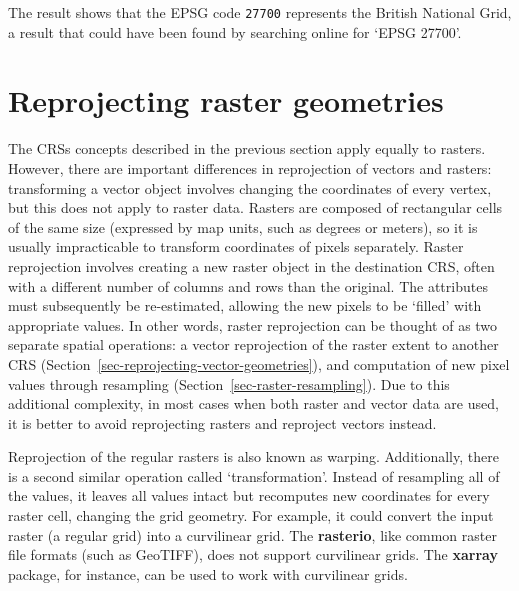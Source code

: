 \documentclass[
  letterpaper,
]{krantz}
\begin{document}
The result shows that the EPSG code \texttt{27700} represents the
British National Grid, a result that could have been found by searching
online for `EPSG 27700'.

\section{Reprojecting raster
geometries}\label{sec-reprojecting-raster-geometries}

The CRSs concepts described in the previous section apply equally to
rasters. However, there are important differences in reprojection of
vectors and rasters: transforming a vector object involves changing the
coordinates of every vertex, but this does not apply to raster data.
Rasters are composed of rectangular cells of the same size (expressed by
map units, such as degrees or meters), so it is usually impracticable to
transform coordinates of pixels separately. Raster reprojection involves
creating a new raster object in the destination CRS, often with a
different number of columns and rows than the original. The attributes
must subsequently be re-estimated, allowing the new pixels to be
`filled' with appropriate values. In other words, raster reprojection
can be thought of as two separate spatial operations: a vector
reprojection of the raster extent to another CRS
(Section~\ref{sec-reprojecting-vector-geometries}), and computation of
new pixel values through resampling
(Section~\ref{sec-raster-resampling}). Due to this additional
complexity, in most cases when both raster and vector data are used, it
is better to avoid reprojecting rasters and reproject vectors instead.

\begin{tcolorbox}[enhanced jigsaw, coltitle=black, colback=white, opacitybacktitle=0.6, rightrule=.15mm, titlerule=0mm, colbacktitle=quarto-callout-note-color!10!white, colframe=quarto-callout-note-color-frame, title=\textcolor{quarto-callout-note-color}{\faInfo}\hspace{0.5em}{Note}, left=2mm, breakable, arc=.35mm, bottomtitle=1mm, toptitle=1mm, bottomrule=.15mm, opacityback=0, leftrule=.75mm, toprule=.15mm]

Reprojection of the regular rasters is also known as warping.
Additionally, there is a second similar operation called
`transformation'. Instead of resampling all of the values, it leaves all
values intact but recomputes new coordinates for every raster cell,
changing the grid geometry. For example, it could convert the input
raster (a regular grid) into a curvilinear grid. The \textbf{rasterio},
like common raster file formats (such as GeoTIFF), does not support
curvilinear grids. The \textbf{xarray} package, for instance, can be
used to work with curvilinear grids.

\end{tcolorbox}
\end{document}
